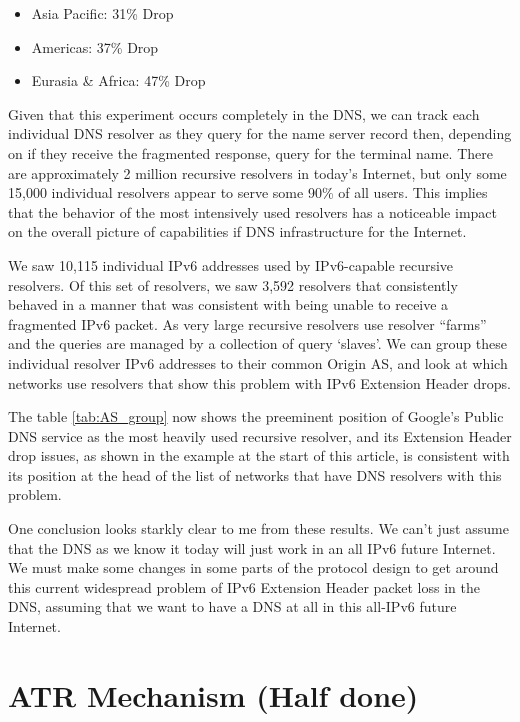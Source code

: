 \begin{itemize}
  \item Asia Pacific: 31\% Drop
  \item Americas: 37\% Drop
  \item Eurasia \& Africa: 47\% Drop
\end{itemize}

Given that this experiment occurs completely in the DNS, we can track each individual DNS resolver as they query for the name server record then, depending on if they receive the fragmented response, query for the terminal name. There are approximately 2 million recursive resolvers in today’s Internet, but only some 15,000 individual resolvers appear to serve some 90\% of all users. This implies that the behavior of the most intensively used resolvers has a noticeable impact on the overall picture of capabilities if DNS infrastructure for the Internet.

We saw 10,115 individual IPv6 addresses used by IPv6-capable recursive resolvers. Of this set of resolvers, we saw 3,592 resolvers that consistently behaved in a manner that was consistent with being unable to receive a fragmented IPv6 packet. As very large recursive resolvers use resolver “farms” and the queries are managed by a collection of query ‘slaves’. We can group these individual resolver IPv6 addresses to their common Origin AS, and look at which networks use resolvers that show this problem with IPv6 Extension Header drops.

The table \ref{tab:AS_group} now shows the preeminent position of Google’s Public DNS service as the most heavily used recursive resolver, and its Extension Header drop issues, as shown in the example at the start of this article, is consistent with its position at the head of the list of networks that have DNS resolvers with this problem.

One conclusion looks starkly clear to me from these results. We can’t just assume that the DNS as we know it today will just work in an all IPv6 future Internet. We must make some changes in some parts of the protocol design to get around this current widespread problem of IPv6 Extension Header packet loss in the DNS, assuming that we want to have a DNS at all in this all-IPv6 future Internet.

\section{ATR Mechanism (Half done)}

